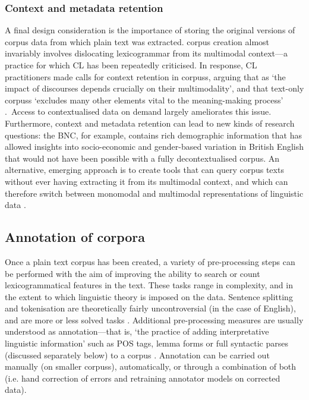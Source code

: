 
\subsubsection*{Context and metadata retention}

A final design consideration is the importance of storing the original versions of \gls{corpus} data from which plain text was extracted. \Gls{corpus} creation almost invariably involves dislocating lexicogrammar from its multimodal context---a practice for which \gls{CL} has been repeatedly criticised. In response, \gls{CL} practitioners made calls for context retention in \glspl{corpus}, arguing that as `the impact of discourses depends crucially on their multimodality', and that text\hyp{}only \glspl{corpus} `excludes many other elements vital to the meaning\hyp{}making process' \cite[pp.~6--7.]{hardt-mautner_only_1995}.~Access to contextualised data on demand largely ameliorates this issue. Furthermore, context and metadata retention can lead to new kinds of research questions: the BNC, for example, contains rich demographic information that has allowed insights into socio\hyp{}economic and gender\hyp{}based variation in British English \cite{baker_sociolinguistics_2010} that would not have been possible with a fully decontextualised \gls{corpus}. An alternative, emerging approach is to create tools that can query \gls{corpus} texts without ever having extracting it from its multimodal context, and which can therefore switch between monomodal and multimodal representations of linguistic data \cite{bateman_multimodal_2013}.

\subsection{Annotation of corpora}\label{sect:annotation}

Once a plain text \gls{corpus} has been created, a variety of pre\hyp{}processing steps can be performed with the aim of improving the ability to search or count lexicogrammatical features in the text. These tasks range in complexity, and in the extent to which linguistic theory is imposed on the data. Sentence splitting and tokenisation are theoretically fairly uncontroversial (in the case of English), and are more or less solved tasks \cite{dridan2012tokenization}. Additional pre\hyp{}processing measures are usually understood as annotation---that is,  `the practice of adding interpretative linguistic information' such as \gls{POS} tags, lemma forms or full syntactic parses (discussed separately below) to a \gls{corpus} \cite[p.~2]{leech_introducing_1997}. Annotation can be carried out manually (on smaller \glspl{corpus}), automatically, or through a combination of both (i.e. hand correction of errors and retraining annotator models on corrected data).

